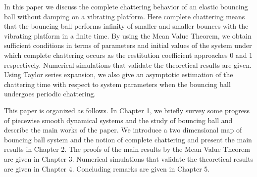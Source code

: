 \documentclass[12pt,openany,CJK,oneside]{cctbook}
\begin{document}
In this paper we discuss the complete chattering behavior of an elastic bouncing ball without damping on a vibrating platform. Here complete chattering means that the bouncing ball performs infinity of smaller and smaller bounces with the vibrating platform in a finite time. By using the Mean Value Theorem, we obtain sufficient conditions in terms of parameters and initial values of the system under which complete chattering occurs as the restitution coefficient approaches 0 and 1 respectively. Numerical simulations that validate the theoretical results are given. Using Taylor series expansion, we also give an asymptotic estimation of the chattering time with respect to system parameters when the bouncing ball undergoes periodic chattering.

This paper is organized as follows. In Chapter 1, we briefly survey some progress of piecewise smooth dynamical systems and the study of bouncing ball and describe the main works of the paper. We introduce a two dimensional map of bouncing ball system and the notion of complete chattering and present the main results in Chapter 2. The proofs of the main results by the Mean Value Theorem are given in Chapter 3. Numerical simulations that validate the theoretical results are given in Chapter 4. Concluding remarks are given in Chapter 5.
\end{document}
